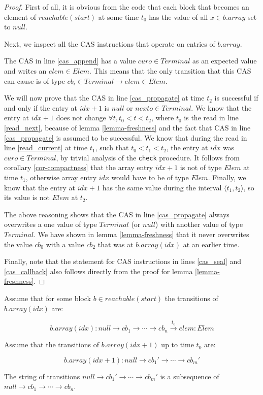 \documentclass[runningheads,a4paper]{llncs}
\begin{document}
\begin{proof}
First of all, it is obvious from the code that each block that becomes
an element of $reachable(start)$ at some time $t_0$ has the value of
all $x \in b.array$ set to $null$.

Next, we inspect all the CAS instructions that operate on entries of
$b.array$.

The CAS in line \ref{cas_append} has a value $curo \in Terminal$ as
an expected value and writes an $elem \in Elem$.
This means that the only transition that this CAS
can cause is of type $cb_i \in Terminal \rightarrow elem \in Elem$.

We will now prove that the CAS in line \ref{cas_propagate} at time $t_2$ is successful if and
only if the entry at $idx + 1$ is $null$ or $nexto \in
Terminal$.
We know that the entry at $idx + 1$ does not change $\forall t, t_0 < t < t_2$,
where $t_0$ is the read in line \ref{read_next},
because of lemma \ref{lemma-freshness} and the fact that CAS in line \ref{cas_propagate} is assumed to be successful.
We know that during the read in line \ref{read_current} at time $t_1$,
such that $t_0 < t_1 < t_2$, the entry at $idx$ was $curo \in
Terminal$, by trivial analysis of the \verb=check= procedure.
It follows from corollary \ref{cor-compactness} that the array entry $idx
+ 1$ is not of type $Elem$ at time $t_1$, otherwise array entry $idx$
would have to be of type $Elem$.
Finally, we know that the entry at $idx + 1$ has the same value during
the interval $\langle t_1, t_2 \rangle$, so its value is not $Elem$ at $t_2$.

The above reasoning shows that the CAS in line \ref{cas_propagate}
always overwrites a one value of type $Terminal$ (or $null$) with
another value of type $Terminal$.
We have shown in lemma \ref{lemma-freshness} that it never
overwrites the value $cb_0$ with a value $cb_2$ that was at
$b.array(idx)$ at an earlier time.

Finally, note that the statement for CAS instructions in lines \ref{cas_seal} and
\ref{cas_callback} also follows directly from the proof for lemma \ref{lemma-freshness}.
\end{proof}


\begin{lemma}[Subsequence]\label{lemma-subsequence}
Assume that for some block $b \in reachable(start)$ the transitions of
$b.array(idx)$ are:

\begin{equation*}
b.array(idx): null \rightarrow cb_1 \rightarrow \cdots \rightarrow
cb_n \stackrel{t_0}{\rightarrow} elem: Elem
\end{equation*}

Assume that the transitions of $b.array(idx + 1)$ up to time $t_0$ are:

\begin{equation*}
b.array(idx + 1): null \rightarrow cb_1' \rightarrow \cdots
\rightarrow cb_m'
\end{equation*}

The string of transitions $null \rightarrow cb_1' \rightarrow \cdots
\rightarrow cb_m'$ is a subsequence of $null \rightarrow cb_1
\rightarrow \cdots \rightarrow cb_n$.
\end{lemma}
\end{document}
